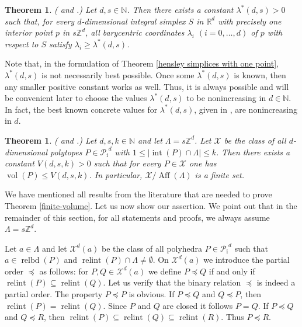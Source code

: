 \documentclass[a4paper]{article}
\theoremstyle{plain}
\newtheorem{theorem}[nn]{Theorem}
\begin{document}
\begin{theorem}
  {\emph{({\cite[Theorem~3.1]{hensley-1983} and
    \cite[Lemma\,2.2]{lagarias-ziegler-1991}}.)}} \label{hensley
    simplices with one point}
Let $d,s \in {\mathbb{N}}$.
Then there exists a constant $\lambda^\ast(d,s) > 0$ such
that, for every $d$-dimensional integral simplex $S$ in
${\mathbb{R}}^d$ with precisely one interior point $p$ in
$s{\mathbb{Z}}^d$, all barycentric coordinates $\lambda_i$
$(i=0,\ldots,d)$ of $p$ with respect to $S$ satisfy
$\lambda_i \ge \lambda^\ast(d,s)$.
\end{theorem}

Note that, in the formulation of Theorem \ref{hensley
simplices with one point}, $\lambda^\ast(d,s)$ is not
necessarily best possible.
Once some $\lambda^\ast(d,s)$ is known, then any smaller
positive constant works as well.
Thus, it is always possible and will be convenient later to
choose the values $\lambda^\ast(d,s)$ to be nonincreasing
in $d \in {\mathbb{N}}$.
In fact, the best known concrete values for
$\lambda^\ast(d,s)$, given in
\cite[Lemma\,2.2]{lagarias-ziegler-1991}, are nonincreasing
in $d$.

\begin{theorem}
  {\emph{({\cite[Theorem~3.6]{hensley-1983} and
    \cite[Theorem\,1]{lagarias-ziegler-1991}}.)}} \label{hensley-finiteness}
Let $d,s,k \in {\mathbb{N}}$ and let $\Lambda = s{\mathbb{Z}}^d$.
Let ${\mathcal{X}}$ be the class of all $d$-dimensional polytopes $P
\in {{\mathcal{P}}_{{\mathop{\mathrm{{i}}}}}}^d$ with $1 \le |{{\mathop{\mathrm{{int}}}}}(P) \cap \Lambda| \le k$.
Then there exists a constant $V(d,s,k) > 0$ such that for
every $P \in {\mathcal{X}}$ one has ${{\mathop{\mathrm{{vol}}}}}(P) \le V(d,s,k)$.
In particular, ${\mathcal{X}} / {{\mathop{\mathrm{{Aff}}}}}(\Lambda)$ is a finite set.
\end{theorem}

We have mentioned all results from the literature that are
needed to prove Theorem \ref{finite-volume}.
Let us now show our assertion.
We point out that in the remainder of this section, for all
statements and proofs, we always assume $\Lambda = s {\mathbb{Z}}^d$.

Let $a \in \Lambda$ and let ${\mathcal{X}}^d(a)$ be the class of
all polyhedra $P \in {{\mathcal{P}}_{{\mathop{\mathrm{{i}}}}}}^d$ such that $a \in {{\mathop{\mathrm{{relbd}}}}}(P)$ and
${{\mathop{\mathrm{{relint}}}}}(P) \cap \Lambda \ne \emptyset$.
On ${\mathcal{X}}^d(a)$ we introduce the partial order $\preceq$ as
follows: for $P, Q \in {\mathcal{X}}^d(a)$ we define $P \preceq Q$ if
and only if ${{\mathop{\mathrm{{relint}}}}}(P) \subseteq {{\mathop{\mathrm{{relint}}}}}(Q)$.
Let us verify that the binary relation $\preceq$ is indeed a
partial order.
The property $P \preceq P$ is obvious.
If $P \preceq Q$ and $Q \preceq P$, then ${{\mathop{\mathrm{{relint}}}}}(P) =
{{\mathop{\mathrm{{relint}}}}}(Q)$.
Since $P$ and $Q$ are closed it follows $P = Q$.
If $P \preceq Q$ and $Q \preceq R$, then ${{\mathop{\mathrm{{relint}}}}}(P)
\subseteq {{\mathop{\mathrm{{relint}}}}}(Q) \subseteq {{\mathop{\mathrm{{relint}}}}}(R)$.
Thus $P \preceq R$.
\end{document}
